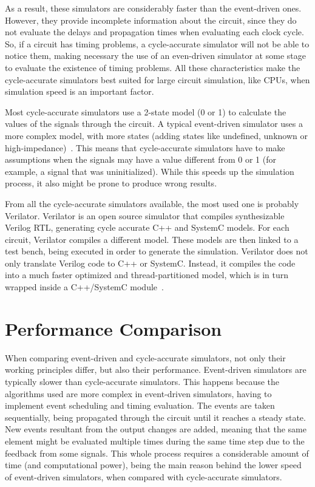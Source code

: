 As a result, these simulators are considerably faster than the event-driven
ones. However, they provide incomplete information about the circuit, since they
do not evaluate the delays and propagation times when evaluating each clock
cycle. So, if a circuit has timing problems, a cycle-accurate simulator will not
be able to notice them, making necessary the use of an even-driven simulator at
some stage to evaluate the existence of timing problems. All these
characteristics make the cycle-accurate simulators best suited for large circuit
simulation, like CPUs, when simulation speed is an important factor.

Most cycle-accurate simulators use a 2-state model (0 or 1) to calculate the
values of the signals through the circuit. A typical event-driven simulator uses
a more complex model, with more states (adding states like undefined, unknown or
high-impedance)~\cite{bennett:verilator}. This means that cycle-accurate
simulators have to make assumptions when the signals may have a value different
from 0 or 1 (for example, a signal that was uninitialized). While this speeds up
the simulation process, it also might be prone to produce wrong results.

From all the cycle-accurate simulators available, the most used one is probably
Verilator. Verilator is an open source simulator that compiles synthesizable
Verilog RTL, generating cycle accurate C++ and SystemC models. For each circuit, Verilator compiles a different model. These models are
then linked to a test bench, being executed in order to generate the
simulation. Verilator does not only translate Verilog code to C++ or
SystemC. Instead, it compiles the code into a much faster optimized and
thread-partitioned model, which is in turn wrapped inside a C++/SystemC
module~\cite{veripool:verilator}.

\section{Performance Comparison}
\label{section:performance}

When comparing event-driven and cycle-accurate simulators, not only their
working principles differ, but also their performance. Event-driven simulators
are typically slower than cycle-accurate simulators. This happens because the
algorithms used are more complex in event-driven simulators, having to implement
event scheduling and timing evaluation. The events are taken sequentially, being
propagated through the circuit until it reaches a steady state. New events
resultant from the output changes are added, meaning that the same element might
be evaluated multiple times during the same time step due to the feedback from
some signals. This whole process requires a considerable amount of time (and
computational power), being the main reason behind the lower speed of
event-driven simulators, when compared with cycle-accurate simulators.

